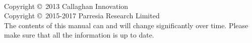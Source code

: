 
  \newpage
  ~\vfill
  \thispagestyle{empty}

  \noindent Copyright \copyright\ 2013 Callaghan Innovation\\ %
  \noindent Copyright \copyright\ 2015-2017 Parresia Research Limited\\ %




  \noindent The contents of this manual can and will change significantly over time.  Please make sure that all the information is up to date.

  \pagestyle{empty} %
  \tableofcontents %
  \cleardoublepage %
  \pagestyle{fancy} %

  \setlength{\parindent}{0pt}
  \setlength{\parskip}{5pt}


